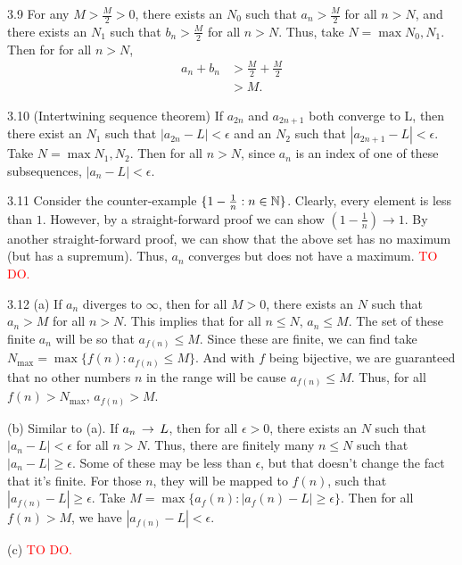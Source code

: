 3.9 For any $M > \frac{M}{2} > 0$, there exists an $N_0$ such that $a_n > \frac{M}{2}$ for all $n > N$, and
there exists an $N_1$ such that $b_n > \frac{M}{2}$ for all $n > N$. Thus, take $N=\max{N_0,N_1}$. Then for
for all $n > N$, 
\begin{align}
    a_n + b_n &> \frac{M}{2} + \frac{M}{2} \\
    &> M.
\end{align}

3.10 (Intertwining sequence theorem) If $a_{2n}$ and $a_{2n+1}$ both converge to L, then there exist an $N_1$ such that $|a_{2n}-L|<\epsilon$ and an $N_2$ such 
that $|a_{2n+1} - L| < \epsilon$. Take $N=\max{N_1, N_2}$. Then for all $n > N$, since $a_n$ is an index of one of these subsequences, $|a_n - L|<\epsilon$.

3.11 Consider the counter-example $\{ 1 - \frac{1}{n} : n \in \mathbb{N} \}$. Clearly, every element is less than $1$. However, by a straight-forward proof we can show $(1-\frac{1}{n}) \rightarrow 1$. 
By another straight-forward proof, we can show that the above set has no maximum (but has a supremum). Thus, $a_n$ converges but does not have a maximum. \textcolor{red}{TO DO.}

3.12 (a) If $a_n$ diverges to $\infty$, then for all $M > 0$, there exists an $N$ such that $a_n > M$ for all $n > N$. 
This implies that for all $n \leq N$, $a_n \leq M$. The set of these finite $a_n$ will be so that $a_{f(n)} \leq M$. Since these are finite, 
we can find take $N_{\max} = \max\{f(n): a_{f(n)} \leq M\}$. And with $f$ being bijective, we are guaranteed that no other numbers $n$ in the range will be
cause $a_{f(n)} \leq M$. Thus, for all $f(n) > N_{\max}$, $a_{f(n)} > M$.

(b) Similar to (a). If $a_n \,\rightarrow\, L$, then for all $\epsilon > 0$, there exists an $N$ such that $|a_n - L| < \epsilon$ for all $n > N$. Thus, there are
finitely many $n \leq N$ such that $|a_n - L| \geq \epsilon$. Some of these may be less than $\epsilon$, but that doesn't change the fact that it's finite. For those $n$, they will be mapped to $f(n)$,
such that $|a_{f(n)} - L| \geq \epsilon$. Take $M = \max \{a_f(n): |a_f(n) - L| \geq \epsilon\}$. Then for all $f(n) > M$, we have $|a_{f(n)} - L| < \epsilon$.

(c) \textcolor{red}{TO DO.} %

